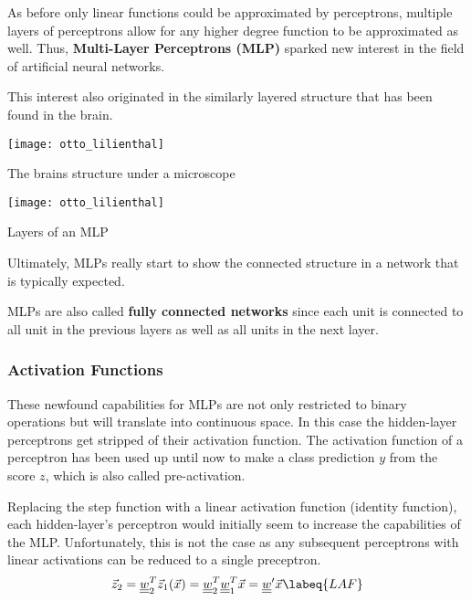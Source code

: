 As before only linear functions could be approximated by perceptrons, multiple layers of perceptrons allow for any higher degree function to be approximated as well.
Thus, \textbf{Multi-Layer Perceptrons (MLP)} sparked new interest in the field of artificial neural networks.

This interest also originated in the similarly layered structure that has been found in the brain.
\begin{marginfigure}
    \texttt{[image: otto\_lilienthal]}
    \caption[]{The brains structure under a microscope}
\end{marginfigure}
\begin{marginfigure}
    \texttt{[image: otto\_lilienthal]}
    \caption[]{Layers of an MLP}
\end{marginfigure}
Ultimately, MLPs really start to show the connected structure in a network that is typically expected.

MLPs are also called \textbf{fully connected networks} since each unit is connected to all unit in the previous layers as well as all units in the next layer.



\subsubsection{Activation Functions}
These newfound capabilities for MLPs are not only restricted to binary operations but will translate into continuous space.
In this case the hidden-layer perceptrons get stripped of their activation function.
The activation function of a perceptron has been used up until now to make a class prediction $y$ from the score $z$, which is also called pre-activation.

Replacing the step function with a linear activation function (\ie identity function), each hidden-layer's perceptron would initially seem to increase the capabilities of the MLP.
Unfortunately, this is not the case as any subsequent perceptrons with linear activations can be reduced to a single preceptron.
\begin{align}
    \vec{z}_2 = \mat{w}^T_2 \vec{z}_1(\vec{x}) = \mat{w}^T_2 \mat{w}^T_1 \vec{x} = \mat{w}' \vec{x}
    \labeq{LAF}
\end{align}

